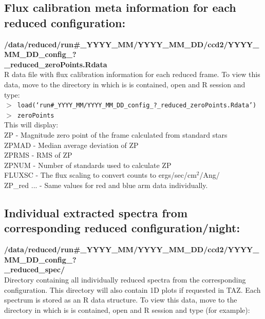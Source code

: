 \documentclass[12pt]{article}
\begin{document}
 
 \subsection{Flux calibration meta information for each reduced configuration:} 
  
  \textbf{/data/reduced/run\#\_YYYY\_MM/YYYY\_MM\_DD/ccd2/YYYY\_MM\_DD\_config\_? \\ \_reduced\_zeroPoints.Rdata} \\
  
  R data file with flux calibration information for each reduced frame. To view this data, move to the directory in which is is contained, open and R session and type:\\
 

\hspace{10mm}  \texttt{$>$ load(`run\#\_YYYY\_MM/YYYY\_MM\_DD\_config\_?\_reduced\_zeroPoints.Rdata')}\\

\hspace{10mm}  \texttt{$>$ zeroPoints}\\

This will display:\\

ZP - Magnitude zero point of the frame calculated from standard stars     \\
ZPMAD - Median average deviation of ZP    \\
ZPRMS - RMS of ZP   \\
ZPNUM - Number of standards used to calculate ZP\\
FLUXSC - The flux scaling to convert counts to ergs/sec/cm$^2$/Ang/\\
ZP\_red ... - Same values for red and blue arm data individually.  \\


 \subsection{Individual extracted spectra from corresponding reduced configuration/night:}
 
  \textbf{/data/reduced/run\#\_YYYY\_MM/YYYY\_MM\_DD/ccd2/YYYY\_MM\_DD\_config\_? \\ \_reduced\_spec/}\\
   
 Directory containing all individually reduced spectra from the corresponding  configuration. This directory will also contain 1D plots if requested in TAZ. Each spectrum is stored as an R data structure. To view this data, move to the directory in which is is contained, open and R session and type (for example):\\
  
\end{document}
